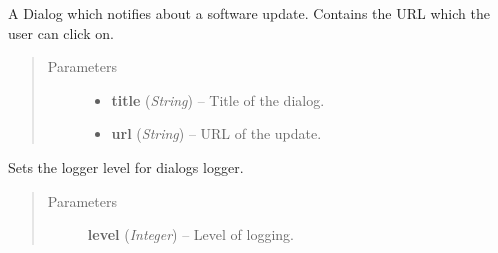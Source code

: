 \documentclass[letterpaper,10pt,english]{sphinxmanual}
\begin{document}
\begin{fulllineitems}
\label{dialogs:dialogs.UpdateDialog}
A Dialog which notifies about a software update.
Contains the URL which the user can click on.
\begin{quote}\begin{description}
\item[{Parameters}] \leavevmode\begin{itemize}
\item {} 
\textbf{title} (\emph{String}) -- Title of the dialog.

\item {} 
\textbf{url} (\emph{String}) -- URL of the update.

\end{itemize}

\end{description}\end{quote}

\end{fulllineitems}


\begin{fulllineitems}
\label{dialogs:dialogs.set_logger_level}
Sets the logger level for dialogs logger.
\begin{quote}\begin{description}
\item[{Parameters}] \leavevmode
\textbf{level} (\emph{Integer}) -- Level of logging.

\end{description}\end{quote}

\end{fulllineitems}

\end{document}
